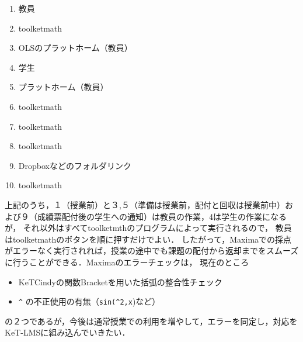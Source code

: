 \documentclass[a4j,12pt]{ujarticle}
\begin{document}
\begin{enumerate}
\item {}教員\vspace{-2mm}
\item {}toolketmath\vspace{-2mm}
\item {}OLSのプラットホーム（教員）\vspace{-2mm}
\item {}学生\vspace{-2mm}
\item {}プラットホーム（教員）\vspace{-2mm}
\item {}toolketmath\vspace{-2mm}
\item {}toolketmath\vspace{-2mm}
\item {}toolketmath\vspace{-2mm}
\item {}Dropboxなどのフォルダリンク\vspace{-2mm}
\item {}toolketmath\vspace{-2mm}
\end{enumerate}

上記のうち，１（授業前）と３,５（準備は授業前，配付と回収は授業前中）および９（成績票配付後の学生への通知）は教員の作業，4は学生の作業になるが，
それ以外はすべてtoolketmthのプログラムによって実行されるので，
教員はtoolketmathのボタンを順に押すだけでよい．
したがって，Maximaでの採点がエラーなく実行されれば，授業の途中でも課題の配付から返却までをスムーズに行うことができる．Maximaのエラーチェックは，
現在のところ\vspace{-2mm}
\begin{itemize}
\item KeTCindyの関数Bracketを用いた括弧の整合性チェック\vspace{-2mm}
\item \verb|^| の不正使用の有無（\verb|sin(^2,x|)など）\vspace{-2mm}
\end{itemize}
の２つであるが，今後は通常授業での利用を増やして，エラーを同定し，対応をKeT-LMSに組み込んでいきたい．
\end{document}
